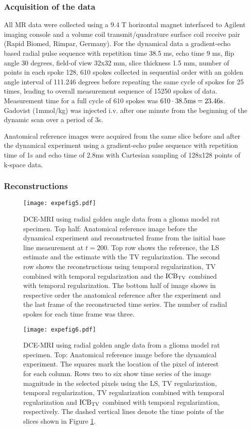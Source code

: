 \subsubsection{Acquisition of the data}
All MR data were collected using a 9.4 T horizontal magnet interfaced to Agilent imaging console and a volume coil transmit/quadrature surface coil receive pair (Rapid Biomed, Rimpar, Germany). 
For the dynamical data a gradient-echo based radial pulse sequence 
with repetition time 38.5 ms, echo time 9 ms, flip angle 30 degrees, field-of view 32x32 mm, slice thickness 1.5 mm, number of points in each spoke 128, 610 spokes collected in sequential order with an golden angle interval of 111.246 degrees before repeating the same cycle of spokes 
for 25 times, leading to overall measurement sequence of 15250 spokes of data. 
Measurement time for a full cycle of 610 spokes was 
$610 \cdot 38.5 {\rm ms} = 23.46 {\rm s}$. 
Gadovist (1mmol/kg) was injected i.v. after one minute from the beginning of the dynamic scan over a period of 3s. 

Anatomical reference images were acquired from the same slice before and after the dynamical experiment using a gradient-echo pulse sequence with repetition time of 1s and echo time of 2.8ms
with Cartesian sampling of 128x128 points of k-space data.

\subsubsection{Reconstructions}

\begin{figure}[ht!]
\centerline{\texttt{[image: expefig5.pdf]}}
\caption{DCE-MRI using radial golden angle data from a glioma model rat specimen. Top half: Anatomical reference image before the dynamical experiment and reconstructed frame
from the initial base line measurement at $t=200$. 
Top row shows the reference, the LS estimate and the estimate with the TV regularization. The second row shows the reconstructions using temporal regularization, TV combined with temporal regularization and the $\mathrm{ICB}_{\mathrm{TV}}$ combined with temporal regularization.
The bottom half of image shows in respective order the anatomical reference after the experiment and the last frame of the reconstructed time series.
The number of radial spokes for each time frame was three.}
\label{efig1}
\end{figure}

\begin{figure}[ht!]
 \centerline{\texttt{[image: expefig6.pdf]}}
\caption{DCE-MRI using radial golden angle data from a glioma model rat specimen. Top: Anatomical reference image before the dynamical experiment. The squares mark the
location of the pixel of interest for each column. 
Rows two to six show time series of the image magnitude in the selected pixels using the LS, TV regularization, temporal  regularization, TV regularization combined with temporal  regularization and $\mathrm{ICB}_{\mathrm{TV}}$ combined with temporal regularization, respectively. 
The dashed vertical lines denote the time points of the slices shown in Figure \ref{efig1}.}
\label{efig2}
\end{figure}

